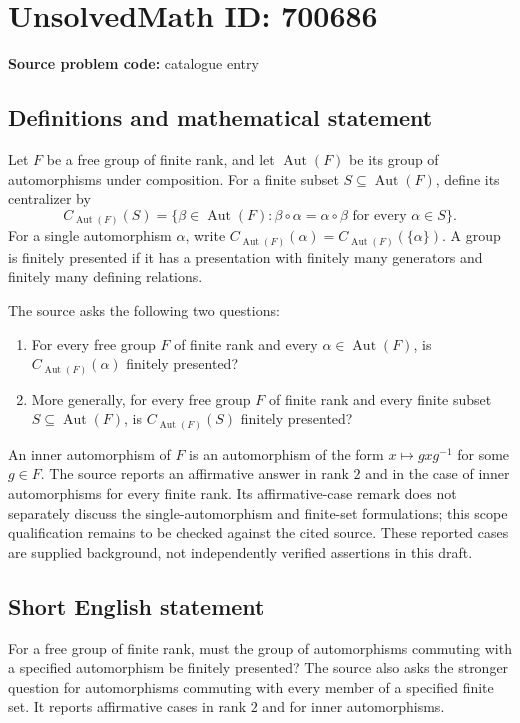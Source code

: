 \documentclass[11pt]{article}
\begin{document}
\section*{UnsolvedMath ID: 700686}
\textbf{Source problem code:} catalogue entry
\subsection{Definitions and mathematical statement}
Let \(F\) be a free group of finite rank, and let \(\operatorname{Aut}(F)\) be its group of automorphisms under composition. For a finite subset \(S\subseteq\operatorname{Aut}(F)\), define its centralizer by
\[
C_{\operatorname{Aut}(F)}(S)=\{\beta\in\operatorname{Aut}(F):\beta\circ\alpha=\alpha\circ\beta\text{ for every }\alpha\in S\}.
\]
For a single automorphism \(\alpha\), write \(C_{\operatorname{Aut}(F)}(\alpha)=C_{\operatorname{Aut}(F)}(\{\alpha\})\). A group is finitely presented if it has a presentation with finitely many generators and finitely many defining relations.

The source asks the following two questions:
\begin{enumerate}
\item For every free group \(F\) of finite rank and every \(\alpha\in\operatorname{Aut}(F)\), is \(C_{\operatorname{Aut}(F)}(\alpha)\) finitely presented?
\item More generally, for every free group \(F\) of finite rank and every finite subset \(S\subseteq\operatorname{Aut}(F)\), is \(C_{\operatorname{Aut}(F)}(S)\) finitely presented?
\end{enumerate}
An inner automorphism of \(F\) is an automorphism of the form \(x\mapsto gxg^{-1}\) for some \(g\in F\). The source reports an affirmative answer in rank \(2\) and in the case of inner automorphisms for every finite rank. Its affirmative-case remark does not separately discuss the single-automorphism and finite-set formulations; this scope qualification remains to be checked against the cited source. These reported cases are supplied background, not independently verified assertions in this draft.
\subsection{Short English statement}
For a free group of finite rank, must the group of automorphisms commuting with a specified automorphism be finitely presented? The source also asks the stronger question for automorphisms commuting with every member of a specified finite set. It reports affirmative cases in rank \(2\) and for inner automorphisms.
\end{document}
